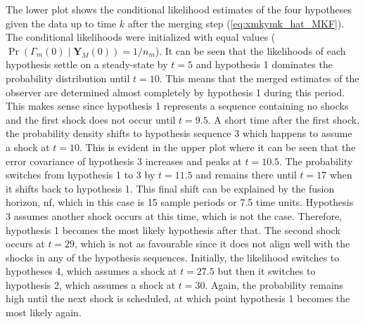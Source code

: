 The lower plot shows the conditional likelihood estimates of the four hypotheses given the data up to time $k$ after the merging step (\ref{eq:xmkymk_hat_MKF}). The conditional likelihoods were initialized with equal values ($\operatorname{Pr}\left(\Gamma_m(0) \mid \mathbf{Y}_M(0)\right)=1/n_m$). It can be seen that the likelihoods of each hypothesis settle on a steady-state by $t=5$ and hypothesis 1 dominates the probability distribution until $t=10$. This means that the merged estimates of the observer are determined almost completely by hypothesis 1 during this period. This makes sense since hypothesis 1 represents a sequence containing no shocks and the first shock does not occur until $t=9.5$. A short time after the first shock, the probability density shifts to hypothesis sequence 3 which happens to assume a shock at $t=10$. This is evident in the upper plot where it can be seen that the error covariance of hypothesis 3 increases and peaks at $t=10.5$. The probability switches from hypothesis 1 to 3 by $t=11.5$ and remains there until $t=17$ when it shifts back to hypothesis 1. This final shift can be explained by the fusion horizon, \gls{nf}, which in this case is 15 sample periods or 7.5 time units. Hypothesis 3 assumes another shock occurs at this time, which is not the case. Therefore, hypothesis 1 becomes the most likely hypothesis after that. The second shock occurs at $t=29$, which is not as favourable since it does not align well with the shocks in any of the hypothesis sequences. Initially, the likelihood switches to hypotheses 4, which assumes a shock at $t=27.5$ but then it switches to hypothesis 2, which assumes a shock at $t=30$. Again, the probability remains high until the next shock is scheduled, at which point hypothesis 1 becomes the most likely again.

